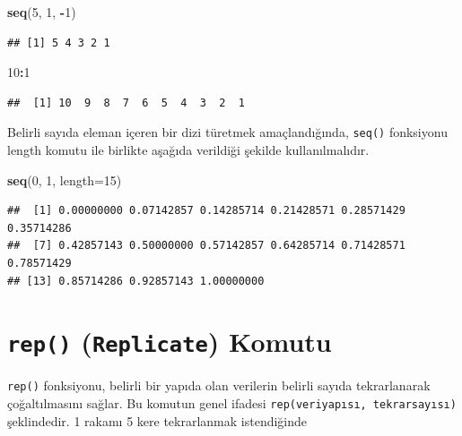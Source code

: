 \documentclass[
]{book}
\newenvironment{Shaded}{\begin{snugshade}}{\end{snugshade}}
\newcommand{\AttributeTok}[1]{\textcolor[rgb]{0.13,0.29,0.53}{#1}}
\newcommand{\DecValTok}[1]{\textcolor[rgb]{0.00,0.00,0.81}{#1}}
\newcommand{\FunctionTok}[1]{\textcolor[rgb]{0.13,0.29,0.53}{\textbf{#1}}}
\newcommand{\NormalTok}[1]{#1}
\newcommand{\SpecialCharTok}[1]{\textcolor[rgb]{0.81,0.36,0.00}{\textbf{#1}}}
\begin{document}
\begin{Shaded}
\begin{Highlighting}[]
\FunctionTok{seq}\NormalTok{(}\DecValTok{5}\NormalTok{, }\DecValTok{1}\NormalTok{, }\SpecialCharTok{{-}}\DecValTok{1}\NormalTok{)}
\end{Highlighting}
\end{Shaded}

\begin{verbatim}
## [1] 5 4 3 2 1
\end{verbatim}

\begin{Shaded}
\begin{Highlighting}[]
\DecValTok{10}\SpecialCharTok{:}\DecValTok{1}
\end{Highlighting}
\end{Shaded}

\begin{verbatim}
##  [1] 10  9  8  7  6  5  4  3  2  1
\end{verbatim}

Belirli sayıda eleman içeren bir dizi türetmek amaçlandığında, \texttt{seq()} fonksiyonu length komutu ile birlikte aşağıda verildiği şekilde kullanılmalıdır.

\begin{Shaded}
\begin{Highlighting}[]
\FunctionTok{seq}\NormalTok{(}\DecValTok{0}\NormalTok{, }\DecValTok{1}\NormalTok{, }\AttributeTok{length=}\DecValTok{15}\NormalTok{)}
\end{Highlighting}
\end{Shaded}

\begin{verbatim}
##  [1] 0.00000000 0.07142857 0.14285714 0.21428571 0.28571429 0.35714286
##  [7] 0.42857143 0.50000000 0.57142857 0.64285714 0.71428571 0.78571429
## [13] 0.85714286 0.92857143 1.00000000
\end{verbatim}

\section{\texorpdfstring{\texttt{rep()} (\texttt{Replicate}) Komutu}{rep() (Replicate) Komutu}}\label{rep-replicate-komutu}

\texttt{rep()} fonksiyonu, belirli bir yapıda olan verilerin belirli sayıda tekrarlanarak çoğaltılmasını sağlar. Bu komutun genel ifadesi \texttt{rep(veriyapısı,\ tekrarsayısı)} şeklindedir. 1 rakamı 5 kere tekrarlanmak istendiğinde
\end{document}
